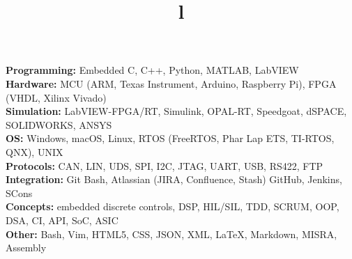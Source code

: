 \documentclass[mm]{res}
\begin{document}



\begin{resume}

\npspctoprule
\section{\headingskills}
\tb \textbf{Programming:} Embedded C, C++, Python, MATLAB, LabVIEW\\
\tb \textbf{Hardware:} MCU (ARM, Texas Instrument, Arduino, Raspberry Pi), FPGA (VHDL, Xilinx Vivado)\\
\tb \textbf{Simulation:} LabVIEW-FPGA/RT, Simulink, OPAL-RT, Speedgoat, dSPACE, SOLIDWORKS, ANSYS\\
\tb \textbf{OS:} Windows, macOS, Linux, RTOS (FreeRTOS, Phar Lap ETS, TI-RTOS, QNX), UNIX\\
\tb \textbf{Protocols:} CAN, LIN, UDS, SPI, I2C, JTAG, UART, USB, RS422, FTP\\
\tb \textbf{Integration:} Git Bash, Atlassian (JIRA, Confluence, Stash) GitHub, Jenkins, SCons\\
\tb \textbf{Concepts:} embedded discrete controls, DSP, HIL/SIL, TDD, SCRUM, OOP, DSA, CI, API, SoC, ASIC\\
\tb \textbf{Other:} Bash, Vim, HTML5, CSS, JSON, XML, \LaTeX, Markdown, MISRA, Assembly\xspace


\toprule

\section{\headingeducation}
\begin{format}
\\
\title{l}\\
\end{format}


\end{resume}
\end{document}
